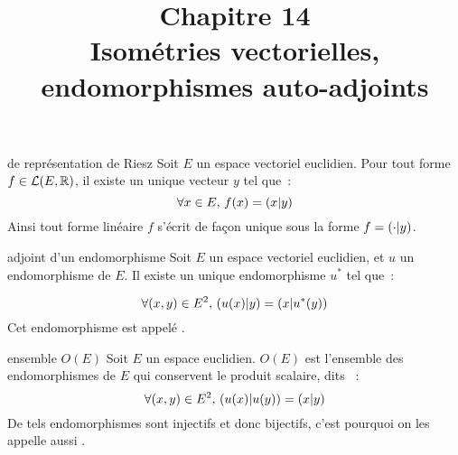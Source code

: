 

\setcounter{chapitre}{14}

\title{\Large Chapitre 14 \\ \Huge Isométries vectorielles, endomorphismes auto-adjoints}



\maketitle

\begin{theoreme}{14.4}{de représentation de Riesz}
    Soit $E$ un espace vectoriel euclidien. Pour tout forme $f \in \mathcal{L}(E,\mathbb{R})$, il existe un unique vecteur $y$ tel que~:
    $$\forall x \in E,\, f(x) = \left( x | y \right)$$
    Ainsi tout forme linéaire $f$ s'écrit de façon unique sous la forme $f = \left( \cdot | y \right)$.
\end{theoreme}

\begin{definition}{14.6}{adjoint d'un endomorphisme}
    Soit $E$ un espace vectoriel euclidien, et $u$ un endomorphisme de $E$. Il existe un unique endomorphisme $u^*$ tel que~:

    $$\forall (x,y) \in E^2,\, \left( u(x) | y \right) = \left( x | u^*(y) \right)$$
    Cet endomorphisme est appelé .
\end{definition}

\begin{definition}{14.10}{ensemble $O(E)$}
    Soit $E$ un espace euclidien. $O(E)$ est l'ensemble des endomorphismes de $E$ qui conservent le produit scalaire, dits ~:
    $$\forall (x,y) \in E^2,\,  \left( u(x) | u(y) \right) = \left( x | y \right)$$
    De tels endomorphismes sont injectifs et donc bijectifs, c'est pourquoi on les appelle aussi .
\end{definition}

